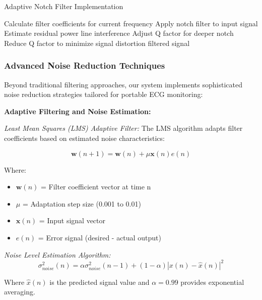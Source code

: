 \documentclass[12pt,a4paper]{article}
\begin{document}
\begin{algorithm}
\caption{Adaptive Notch Filter Implementation}
\begin{algorithmic}
    \STATE Calculate filter coefficients for current frequency
    \STATE Apply notch filter to input signal
    \STATE Estimate residual power line interference
        \STATE Adjust Q factor for deeper notch
    \ELSE
        \STATE Reduce Q factor to minimize signal distortion
    \ENDIF
    \RETURN filtered signal
\ENDPROCEDURE
\end{algorithmic}
\end{algorithm}
\newpage
\subsubsection{Advanced Noise Reduction Techniques}

Beyond traditional filtering approaches, our system implements sophisticated noise reduction strategies tailored for portable ECG monitoring:

\vspace{0.5cm}

\textbf{Adaptive Filtering and Noise Estimation:}

\textit{Least Mean Squares (LMS) Adaptive Filter:}
The LMS algorithm adapts filter coefficients based on estimated noise characteristics:

\begin{equation*}
\mathbf{w}(n+1) = \mathbf{w}(n) + \mu \mathbf{x}(n) e(n)
\end{equation*}

Where:
\begin{itemize}
\item $\mathbf{w}(n)$ = Filter coefficient vector at time n
\item $\mu$ = Adaptation step size (0.001 to 0.01)
\item $\mathbf{x}(n)$ = Input signal vector
\item $e(n)$ = Error signal (desired - actual output)
\end{itemize}

\textit{Noise Level Estimation Algorithm:}
\begin{equation*}
\sigma_{noise}^2(n) = \alpha \sigma_{noise}^2(n-1) + (1-\alpha)|x(n) - \hat{x}(n)|^2
\end{equation*}

Where $\hat{x}(n)$ is the predicted signal value and $\alpha = 0.99$ provides exponential averaging.
\end{document}
